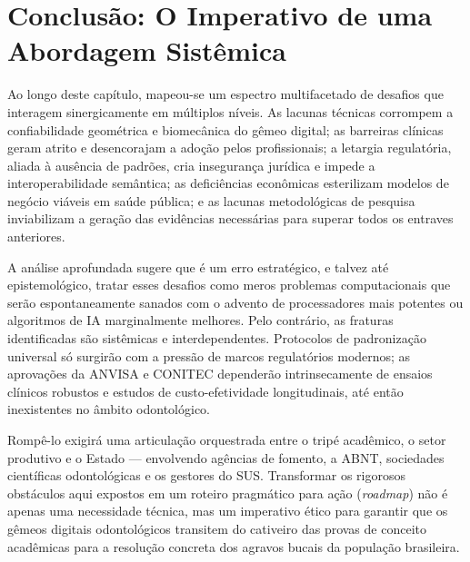 \section{Conclusão: O Imperativo de uma Abordagem Sistêmica}

Ao longo deste capítulo, mapeou-se um espectro multifacetado de desafios que interagem sinergicamente em múltiplos níveis. As lacunas técnicas corrompem a confiabilidade geométrica e biomecânica do gêmeo digital; as barreiras clínicas geram atrito e desencorajam a adoção pelos profissionais; a letargia regulatória, aliada à ausência de padrões, cria insegurança jurídica e impede a interoperabilidade semântica; as deficiências econômicas esterilizam modelos de negócio viáveis em saúde pública; e as lacunas metodológicas de pesquisa inviabilizam a geração das evidências necessárias para superar todos os entraves anteriores.

A análise aprofundada sugere que é um erro estratégico, e talvez até epistemológico, tratar esses desafios como meros problemas computacionais que serão espontaneamente sanados com o advento de processadores mais potentes ou algoritmos de IA marginalmente melhores. Pelo contrário, as fraturas identificadas são sistêmicas e interdependentes. Protocolos de padronização universal só surgirão com a pressão de marcos regulatórios modernos; as aprovações da ANVISA e CONITEC dependerão intrinsecamente de ensaios clínicos robustos e estudos de custo-efetividade longitudinais, até então inexistentes no âmbito odontológico.


Rompê-lo exigirá uma articulação orquestrada entre o tripé acadêmico, o setor produtivo e o Estado — envolvendo agências de fomento, a ABNT, sociedades científicas odontológicas e os gestores do SUS. Transformar os rigorosos obstáculos aqui expostos em um roteiro pragmático para ação (\textit{roadmap}) não é apenas uma necessidade técnica, mas um imperativo ético para garantir que os gêmeos digitais odontológicos transitem do cativeiro das provas de conceito acadêmicas para a resolução concreta dos agravos bucais da população brasileira.
